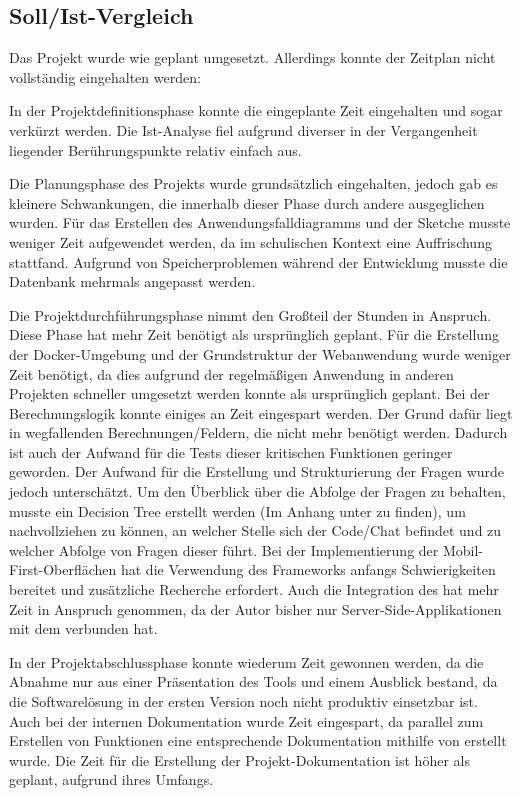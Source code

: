 \subsection{Soll/Ist-Vergleich}
\label{sec:Abschlussphase:Soll/Ist-Vergleich}

Das Projekt wurde wie geplant umgesetzt. Allerdings konnte der Zeitplan nicht vollständig eingehalten werden:

In der Projektdefinitionsphase konnte die eingeplante Zeit eingehalten und sogar verkürzt werden. Die Ist-Analyse fiel aufgrund diverser in der Vergangenheit liegender Berührungspunkte relativ einfach aus.

Die Planungsphase des Projekts wurde grundsätzlich eingehalten, jedoch gab es kleinere Schwankungen, die innerhalb dieser Phase durch andere ausgeglichen wurden. Für das Erstellen des Anwendungsfalldiagramms und der Sketche musste weniger Zeit aufgewendet werden, da im schulischen Kontext eine Auffrischung stattfand. Aufgrund von Speicherproblemen während der Entwicklung musste die Datenbank mehrmals angepasst werden.

Die Projektdurchführungsphase nimmt den Großteil der Stunden in Anspruch. Diese Phase hat mehr Zeit benötigt als ursprünglich geplant. Für die Erstellung der Docker-Umgebung und der Grundstruktur der Webanwendung wurde weniger Zeit benötigt, da dies aufgrund der regelmäßigen Anwendung in anderen Projekten schneller umgesetzt werden konnte als ursprünglich geplant. Bei der Berechnungslogik konnte einiges an Zeit eingespart werden. Der Grund dafür liegt in wegfallenden Berechnungen/Feldern, die nicht mehr benötigt werden. Dadurch ist auch der Aufwand für die Tests dieser kritischen Funktionen geringer geworden. Der Aufwand für die Erstellung und Strukturierung der Fragen wurde jedoch unterschätzt. Um den Überblick über die Abfolge der Fragen zu behalten, musste ein Decision Tree erstellt werden (Im Anhang unter  zu finden), um nachvollziehen zu können, an welcher Stelle sich der Code/Chat befindet und zu welcher Abfolge von Fragen dieser führt. Bei der Implementierung der Mobil-First-Oberflächen hat die Verwendung des Frameworks  anfangs Schwierigkeiten bereitet und zusätzliche Recherche erfordert. Auch die Integration des  hat mehr Zeit in Anspruch genommen, da der Autor bisher nur Server-Side-Applikationen mit dem  verbunden hat. 

In der Projektabschlussphase konnte wiederum Zeit gewonnen werden, da die Abnahme nur aus einer Präsentation des Tools und einem Ausblick bestand, da die Softwarelösung in der ersten Version noch nicht produktiv einsetzbar ist. Auch bei der internen Dokumentation wurde Zeit eingespart, da parallel zum Erstellen von Funktionen eine entsprechende Dokumentation mithilfe von  erstellt wurde. Die Zeit für die Erstellung der Projekt-Dokumentation ist höher als geplant, aufgrund ihres Umfangs.

